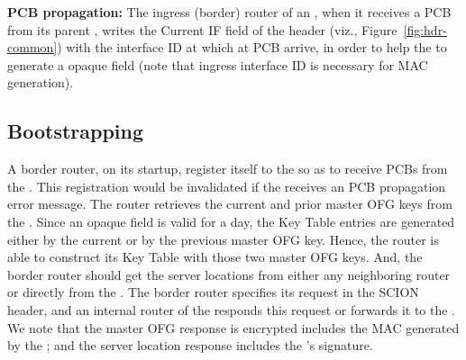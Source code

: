 {\bf PCB propagation: } The ingress (border) router of an \AD, when
it receives a PCB from its parent \AD, writes the Current IF field of
the header (viz., Figure~\ref{fig:hdr-common}) with the interface ID
at which at PCB arrive, in order to help the \BS to generate a opaque
field (note that ingress interface ID is necessary for MAC
generation).
 
\subsection{Bootstrapping}
A border router, on its startup, register itself to the \BS so as to
receive PCBs from the \BS. This registration would be invalidated if
the \BS receives an PCB propagation error message.  The router retrieves the current and prior master
OFG keys from the \CS. Since an opaque field is valid for a day, the
Key Table entries are generated either by the current or by the
previous master OFG key. Hence, the router is able to construct its
Key Table with those two master OFG keys. And, the border router
should get the server locations from either any neighboring router or
directly from the \CS. The border router specifies its request in the
SCION header, and an internal router of the \AD responds this request
or forwards it to the \CS. We note that the master OFG response is
encrypted includes the MAC generated by the \CS; and the server
location response includes the \CS's signature.
